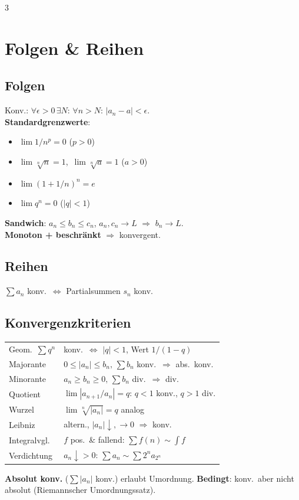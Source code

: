 \documentclass[8pt,a4paper]{extarticle}
\begin{document}

\begin{multicols*}{3}

\section{Folgen \& Reihen}
\subsection{Folgen}
Konv.: $\forall\epsilon\!>\!0\,\exists N\!:\,\forall n\!>\!N\!:\,|a_n-a|<\epsilon$.\\
\textbf{Standardgrenzwerte}:
\begin{itemize}
\item $\lim 1/n^p=0$ ($p>0$)
\item $\lim\sqrt[n]{n}=1$,\ $\lim\sqrt[n]{a}=1$ ($a>0$)
\item $\lim(1+1/n)^n=e$
\item $\lim q^n=0$ ($|q|<1$)
\end{itemize}
\textbf{Sandwich}: $a_n\!\le\!b_n\!\le\!c_n$, $a_n,c_n\!\to\!L$ $\Rightarrow$ $b_n\!\to\!L$.\\
\textbf{Monoton + beschr\"ankt} $\Rightarrow$ konvergent.

\subsection{Reihen}
$\sum a_n$ konv.\ $\Leftrightarrow$ Partialsummen $s_n$ konv.

\subsection{Konvergenzkriterien}
\begin{tabularx}{\linewidth}{@{}l@{\ }X@{}}
Geom.\ $\sum q^n$ & konv.\ $\Leftrightarrow$ $|q|<1$, Wert $1/(1{-}q)$ \\
Majorante & $0\!\le\!|a_n|\!\le\!b_n,\,\sum b_n$ konv.\ $\Rightarrow$ abs.\ konv. \\
Minorante & $a_n\!\ge\!b_n\!\ge\!0,\,\sum b_n$ div.\ $\Rightarrow$ div. \\
Quotient & $\lim|a_{n+1}/a_n|{=}q$: $q\!<\!1$ konv., $q\!>\!1$ div. \\
Wurzel & $\lim\sqrt[n]{|a_n|}{=}q$ analog \\
Leibniz & altern., $|a_n|\!\downarrow,\!\to\!0$ $\Rightarrow$ konv. \\
Integralvgl. & $f$ pos.\ \& fallend: $\sum f(n)\sim\!\int f$ \\
Verdichtung & $a_n\!\downarrow\!>0$: $\sum a_n\sim\sum 2^n a_{2^n}$ \\
\end{tabularx}
\textbf{Absolut konv.} ($\sum|a_n|$ konv.) erlaubt Umordnung. \textbf{Bedingt}: konv.\ aber nicht absolut (Riemannscher Umordnungssatz).


\end{multicols*}
\end{document}
